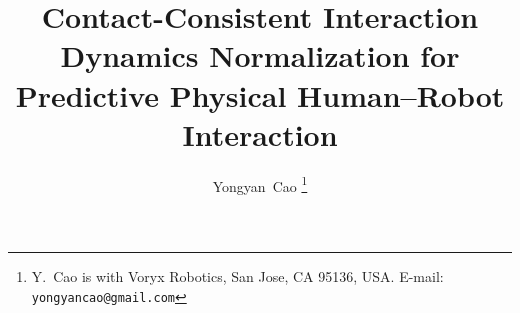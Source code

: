 \documentclass[journal]{IEEEtran}
\begin{document}
\title{Contact-Consistent Interaction Dynamics Normalization for
       Predictive Physical Human--Robot Interaction}

\author{Yongyan~Cao%
  \thanks{Y.~Cao is with Voryx Robotics, San Jose, CA 95136, USA.
          E-mail: \texttt{yongyancao@gmail.com}}}

\maketitle


\end{document}

